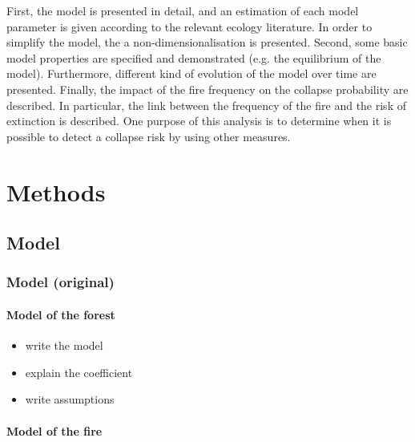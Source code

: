 \documentclass{article}
\begin{document}
First, the model is presented in detail, and an estimation of each model parameter is given according to the relevant ecology literature. In order to simplify the model, the a non-dimensionalisation is presented. Second, some basic model properties are specified and demonstrated (e.g. the equilibrium of the model). Furthermore, different kind of evolution of the model over time are presented. Finally, the impact of the fire frequency on the collapse probability are described. In particular, the link between the frequency of the fire and the risk of extinction is described. One purpose of this analysis is to determine when it is possible to detect a collapse risk by using other measures.





\newpage
\section{Methods}


\subsection{Model}

\subsubsection{Model (original)}

\paragraph{Model of the forest}

\begin{itemize}
    \item write the model 
    \item explain the coefficient
    \item write assumptions
\end{itemize}

\paragraph{Model of the fire}
\end{document}

